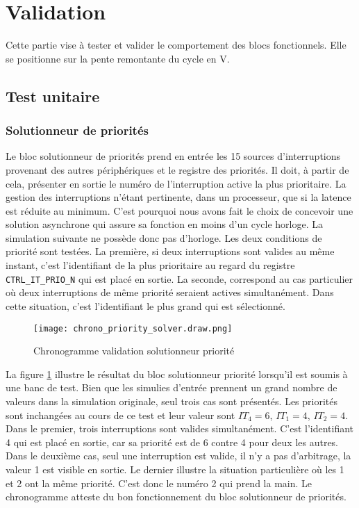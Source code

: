 \section{Validation}

Cette partie vise à tester et valider le comportement des blocs fonctionnels.
Elle se positionne sur la pente remontante du cycle en V.

\subsection{Test unitaire}

\subsubsection{Solutionneur de priorités}
Le bloc solutionneur de priorités prend en entrée les 15 sources d'interruptions provenant des autres périphériques et le registre des priorités.
Il doit, à partir de cela, présenter en sortie le numéro de l'interruption active la plus prioritaire.
La gestion des interruptions n'étant pertinente, dans un processeur, que si la latence est réduite au minimum.
C'est pourquoi nous avons fait le choix de concevoir une solution asynchrone qui assure sa fonction en moins d'un cycle horloge.
La simulation suivante ne possède donc pas d'horloge.
Les deux conditions de priorité sont testées.
La première, si deux interruptions sont valides au même instant, c'est l'identifiant de la plus prioritaire au regard du registre \texttt{CTRL\_IT\_PRIO\_N} qui est placé en sortie.
La seconde, correspond au cas particulier où deux interruptions de même priorité seraient actives simultanément.
Dans cette situation, c'est l'identifiant le plus grand qui est sélectionné.
\begin{figure}[H]
    \centering
    \texttt{[image: chrono\_priority\_solver.draw.png]}
    \caption{Chronogramme validation solutionneur priorité}
    \label{fig:chrono_prio_solv}
\end{figure}
La figure \ref{fig:chrono_prio_solv} illustre le résultat du bloc solutionneur priorité lorsqu'il est soumis à une banc de test.
Bien que les simulies d'entrée prennent un grand nombre de valeurs dans la simulation originale, seul trois cas sont présentés.
Les priorités sont inchangées au cours de ce test et leur valeur sont $IT_4=6$, $IT_1=4$, $IT_2=4$.
Dans le premier, trois interruptions sont valides simultanément.
C'est l'identifiant 4 qui est placé en sortie, car sa priorité est de 6 contre 4 pour deux les autres.
Dans le deuxième cas, seul une interruption est valide, il n'y a pas d'arbitrage, la valeur 1 est visible en sortie.
Le dernier illustre la situation particulière où les 1 et 2 ont la même priorité.
C'est donc le numéro 2 qui prend la main.
Le chronogramme atteste du bon fonctionnement du bloc solutionneur de priorités.